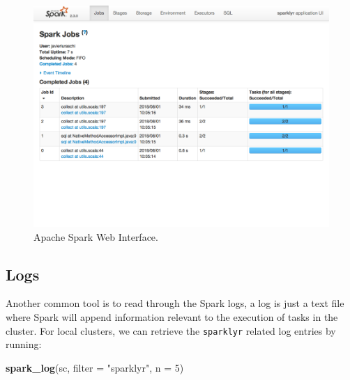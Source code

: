 \documentclass[]{book}
\newenvironment{Shaded}{\begin{snugshade}}{\end{snugshade}}
\newcommand{\DataTypeTok}[1]{\textcolor[rgb]{0.13,0.29,0.53}{#1}}
\newcommand{\DecValTok}[1]{\textcolor[rgb]{0.00,0.00,0.81}{#1}}
\newcommand{\KeywordTok}[1]{\textcolor[rgb]{0.13,0.29,0.53}{\textbf{#1}}}
\newcommand{\NormalTok}[1]{#1}
\newcommand{\StringTok}[1]{\textcolor[rgb]{0.31,0.60,0.02}{#1}}
\theoremstyle{definition}
\theoremstyle{definition}
\theoremstyle{definition}
\theoremstyle{remark}
\begin{document}
\begin{figure}

{\centering \includegraphics[width=13.78in]{images/02-getting-started-spark-web} 

}

\caption{Apache Spark Web Interface.}\label{fig:spark-web}
\end{figure}

\hypertarget{logs}{%
\subsection{Logs}\label{logs}}

Another common tool is to read through the Spark logs, a log is just a
text file where Spark will append information relevant to the execution
of tasks in the cluster. For local clusters, we can retrieve the
\texttt{sparklyr} related log entries by running:

\begin{Shaded}
\begin{Highlighting}[]
\KeywordTok{spark_log}\NormalTok{(sc, }\DataTypeTok{filter =} \StringTok{"sparklyr"}\NormalTok{, }\DataTypeTok{n =} \DecValTok{5}\NormalTok{)}
\end{Highlighting}
\end{Shaded}
\end{document}
